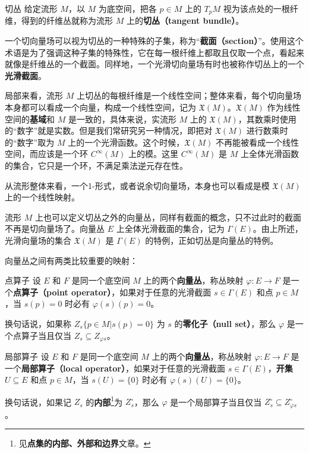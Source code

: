 \begin{definition}{切丛}
给定流形 $M$，以 $M$ 为底空间，把各 $p\in M$ 上的 $T_pM$ 视为该点处的一根纤维，得到的纤维丛就称为流形 $M$ 上的\textbf{切丛（tangent bundle）}。
\end{definition}

一个切向量场可以视为切丛的一种特殊的子集，称为“\textbf{截面（section）}”。使用这个术语是为了强调这种子集的特殊性，它在每一根纤维上都取且仅取一个点，看起来就像是纤维丛的一个截面。同样地，一个光滑切向量场有时也被称作切丛上的一个\textbf{光滑截面}。

局部来看，流形 $M$ 上切丛的每根纤维是一个线性空间；整体来看，每个切向量场本身都可以看成一个向量，构成一个线性空间，记为 $\mathfrak{X}(M)$。$\mathfrak{X}(M)$ 作为线性空间的\textbf{基域}和 $M$ 是一致的，具体来说，实流形 $M$ 上的 $\mathfrak{X}(M)$，其数乘时使用的“数字”就是实数。但是我们常研究另一种情况，即把对 $\mathfrak{X}(M)$ 进行数乘时的“数字”取为 $M$ 上的一个光滑函数。这个时候，$\mathfrak{X}(M)$ 不再能被看成一个线性空间，而应该是一个环 $C^\infty(M)$ 上的模。这里 $C^\infty(M)$ 是 $M$ 上全体光滑函数的集合，它只是一个环，不满足乘法逆元存在性。

从流形整体来看，一个1-形式，或者说余切向量场，本身也可以看成是模 $\mathfrak{X}(M)$ 上的一个线性映射。

流形 $M$ 上也可以定义切丛之外的向量丛，同样有截面的概念，只不过此时的截面不再是切向量场了。向量丛 $E$ 上全体光滑截面的集合，记为 $\Gamma(E)$。由上所述，光滑向量场的集合 $\mathfrak{X}(M)$ 是 $\Gamma(E)$ 的特例，正如切丛是向量丛的特例。

向量丛之间有两类比较重要的映射：

\begin{definition}{点算子}
设 $E$ 和 $F$ 是同一个底空间 $M$ 上的两个\textbf{向量丛}，称丛映射 $\varphi:E\rightarrow F$ 是一个\textbf{点算子（point operator）}，如果对于任意的光滑截面 $s\in\Gamma(E)$ 和点 $p\in M$，当 $s(p)=0$ 时必有 $\varphi(s)(p)=0$。

换句话说，如果称 $Z_s\{p\in M|s(p)=0\}$ 为 $s$ 的\textbf{零化子（null set）}，那么 $\varphi$ 是一个点算子当且仅当 $Z_s\subseteq Z_{\varphi{s}}$。
\end{definition}

\begin{definition}{局部算子}
设 $E$ 和 $F$ 是同一个底空间 $M$ 上的两个\textbf{向量丛}，称丛映射 $\varphi:E\rightarrow F$ 是一个\textbf{局部算子（local operator）}，如果对于任意的光滑截面 $s\in\Gamma(E)$，\textbf{开集}$U\subseteq E$ 和点 $p\in M$，当 $s(U)=\{0\}$ 时必有 $\varphi(s)(U)=\{0\}$。

换句话说，如果记 $Z_s$ 的\textbf{内部}\footnote{见\textbf{点集的内部、外部和边界}文章。}为 $Z_s^\circ$，那么 $\varphi$ 是一个局部算子当且仅当 $Z_s^\circ\subseteq Z_{\varphi{s}}^\circ$。
\end{definition}

